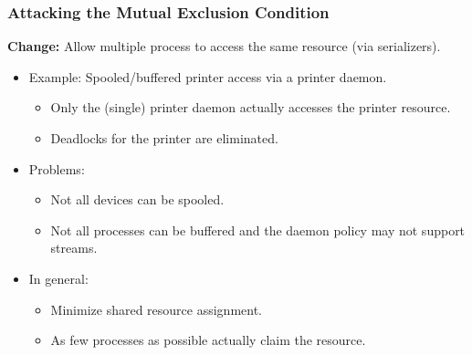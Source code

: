 \documentclass[a4paper, 11pt, accentcolor = tud3b]{tudreport}
\begin{document}
                \subsubsection{Attacking the Mutual Exclusion Condition}
                    \textbf{Change:} Allow multiple process to access the same resource (via serializers).
                    \begin{itemize}
                    	\item Example: Spooled/buffered printer access via a printer daemon.
	                    	\begin{itemize}
	                    		\item Only the (single) printer daemon actually accesses the printer resource.
	                    		\item Deadlocks for the printer are eliminated.
	                    	\end{itemize}
                    	\item Problems:
	                    	\begin{itemize}
		                    	\item Not all devices can be spooled.
		                    	\item Not all processes can be buffered and the daemon policy may not support streams.
							\end{itemize}
						\item In general:
							\begin{itemize}
								\item Minimize shared resource assignment.
								\item As few processes as possible actually claim the resource.
							\end{itemize}
                    \end{itemize}
\end{document}
